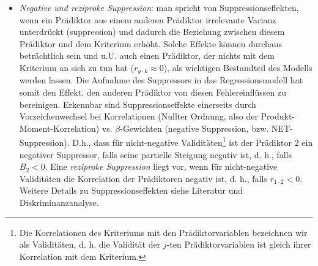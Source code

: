 \documentclass[]{article}
\providecommand{\tightlist}{%
  \setlength{\itemsep}{0pt}\setlength{\parskip}{0pt}}
\let\rmarkdownfootnote\footnote%
\def\footnote{\protect\rmarkdownfootnote}
\begin{document}
\begin{enumerate}
  \begin{itemize}
  \tightlist
  \item
    \emph{Negative und reziproke Suppression}: man spricht von
    Suppressionseffekten, wenn ein Prädiktor aus einem anderen Prädiktor
    irrelevante Varianz unterdrückt (suppression) und dadurch die
    Beziehung zwischen diesem Prädiktor und dem Kriterium erhöht. Solche
    Effekte können durchaus beträchtlich sein und u.U. auch einen
    Prädiktor, der nichts mit dem Kriterium an sich zu tun hat
    (\(r_{y\cdot k} \approx 0\)), als wichtigen Bestandteil des Modells
    werden lassen. Die Aufnahme des Suppressors in das Regressionsmodell
    hat somit den Effekt, den anderen Prädiktor von diesen
    Fehlereinflüssen zu bereinigen. Erkennbar sind Suppressionseffekte
    einerseits durch Vorzeichenwechsel bei Korrelationen (Nullter
    Ordnung, also der Produkt-Moment-Korrelation) vs.
    \(\beta\)-Gewichten (negative Suppression, bzw. NET-Suppression).
    D.h., dass für nicht-negative Validitäten\footnote{Die Korrelationen
      des Kriteriums mit den Prädiktorvariablen bezeichnen wir als
      Validitäten, d. h. die Validität der \(j\)-ten Prädiktorvariablen
      ist gleich ihrer Korrelation mit dem Kriterium.} ist der Prädiktor
    \(2\) ein negativer Suppressor, falls seine partielle Steigung
    negativ ist, d. h., falls \(B_2 < 0\). Eine \emph{reziproke
    Suppression} liegt vor, wenn für nicht-negative Validitäten die
    Korrelation der Prädiktoren negativ ist, d. h., falls
    \(r_{1\cdot2} < 0\). Weitere Details zu Suppressionseffekten siehe
    Literatur und Diskriminanzanalyse.
  \end{itemize}
\end{enumerate}
\end{document}
